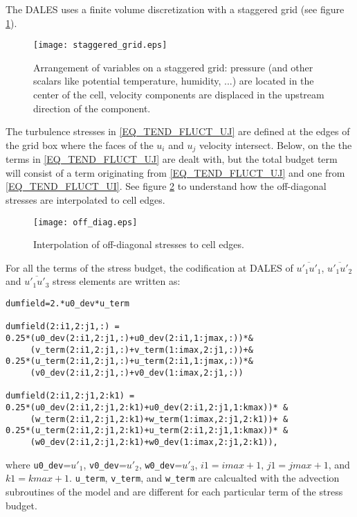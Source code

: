 \documentclass[10pt]{article}
\begin{document}
The DALES uses a finite volume discretization with a staggered grid \cite{harlow:numerical} (see figure \ref{FIG_STAGGERED}).
\begin{figure}[H]
	\centering
	\texttt{[image: staggered\_grid.eps]}
	\caption{\small Arrangement of variables on a staggered grid: pressure (and other scalars like potential temperature, humidity, ...) 
are located in the center of the cell, velocity components are displaced in the upstream direction of the component.}
	\label{FIG_STAGGERED}
\end{figure}

The turbulence stresses in \ref{EQ_TEND_FLUCT_UJ} are defined at the edges of the grid box where the faces of the $u_i$ and $u_j$ 
velocity intersect. Below, on the the terms in \ref{EQ_TEND_FLUCT_UJ} are dealt with, but the total budget term will consist of a 
term originating from \ref{EQ_TEND_FLUCT_UJ} and one from \ref{EQ_TEND_FLUCT_UI}. See figure \ref{off-diagonal} to understand how the 
off-diagonal stresses are interpolated to cell edges. 

\begin{figure}[H]
	\centering
	\texttt{[image: off\_diag.eps]}
	\caption{\small Interpolation of off-diagonal stresses to cell edges.}
	\label{off-diagonal}
\end{figure}

For all the terms of the stress budget, the codification at DALES of $\overline{u'_1 u'_1}$, 
$\overline{u'_1 u'_2}$ and $\overline{u'_1 u'_3}$ stress elements are written as:

\begin{verbatim}
dumfield=2.*u0_dev*u_term

dumfield(2:i1,2:j1,:) =
0.25*(u0_dev(2:i1,2:j1,:)+u0_dev(2:i1,1:jmax,:))*&
     (v_term(2:i1,2:j1,:)+v_term(1:imax,2:j1,:))+&
0.25*(u_term(2:i1,2:j1,:)+u_term(2:i1,1:jmax,:))*&
     (v0_dev(2:i1,2:j1,:)+v0_dev(1:imax,2:j1,:))

dumfield(2:i1,2:j1,2:k1) =
0.25*(u0_dev(2:i1,2:j1,2:k1)+u0_dev(2:i1,2:j1,1:kmax))* &
     (w_term(2:i1,2:j1,2:k1)+w_term(1:imax,2:j1,2:k1))+ &  
0.25*(u_term(2:i1,2:j1,2:k1)+u_term(2:i1,2:j1,1:kmax))* &
     (w0_dev(2:i1,2:j1,2:k1)+w0_dev(1:imax,2:j1,2:k1)), 
\end{verbatim}

\noindent where \verb=u0_dev==$u'_1$, \verb=v0_dev==$u'_2$, \verb=w0_dev==$u'_3$, $i1=imax+1$, $j1=jmax+1$, and $k1=kmax+1$. 
\verb=u_term=, \verb=v_term=, and \verb=w_term= are calcualted with the advection subroutines of the model and are different for
each particular term of the stress budget.
\end{document}
